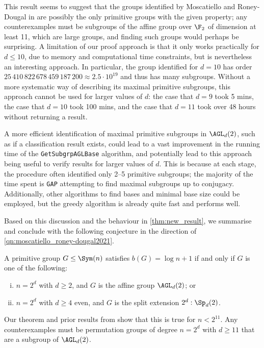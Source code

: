 This result seems to suggest that the groups identified by Moscatiello and Roney-Dougal in \cite{moscatiello_roney-dougal2021} are possibly the only primitive groups with the given property; any counterexamples must be subgroups of the affine group over $\F_2$ of dimension at least 11, which are large groups, and finding such groups would perhaps be surprising. A limitation of our proof approach is that it only works practically for $d \leq 10$, due to memory and computational time constraints, but is nevertheless an interesting approach. In particular, the group identified for $d = 10$ has order $25\,410\,822\,678\,459\,187\,200 \approx 2.5 \cdot 10^{19}$ and thus has many subgroups. Without a more systematic way of describing its maximal primitive subgroups, this approach cannot be used for larger values of $d$: the case that $d = 9$ took 5 mins, the case that $d = 10$ took 100 mins, and the case that $d = 11$ took over 48 hours without returning a result.

A more efficient identification of maximal primitive subgroups in $\AGL_d(2)$, such as if a classification result exists, could lead to a vast improvement in the running time of the \texttt{GetSubgrpAGLBase} algorithm, and potentially lead to this approach being useful to verify results for larger values of $d$. This is because at each stage, the procedure often identified only 2--5 primitive subgroups; the majority of the time spent is \texttt{GAP} attempting to find maximal subgroups up to conjugacy. Additionally, other algorithms to find bases and minimal base size could be employed, but the greedy algorithm is already quite fast and performs well.

Based on this discussion and the behaviour in \autoref{thm:new_result}, we summarise and conclude with the following conjecture in the direction of \autoref{qn:moscatiello_roney-dougal2021}.

\begin{conjecture}\label{conj:new_result}
    A primitive group $G \leq \Sym(n)$ satisfies $b(G) = \log n + 1$ if and only if $G$ is one of the following:
    \begin{enumerate}[(i)]
        \item $n = 2^d$ with $d \geq 2$, and $G$ is the affine group $\AGL_d(2)$; or
        \item $n = 2^d$ with $d \geq 4$ even, and $G$ is the split extension $2^d : \Sp_d(2)$.
    \end{enumerate}
\end{conjecture}

Our theorem and prior results from \cite{moscatiello_roney-dougal2021} show that this is true for $n < 2^{11}$. Any counterexamples must be permutation groups of degree $n = 2^d$ with $d \geq 11$ that are a subgroup of $\AGL_d(2)$.